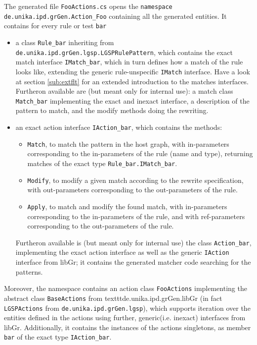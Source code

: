The generated file \texttt{FooActions.cs} opens the \texttt{namespace de.unika.ipd.grGen.Action\_Foo} containing all the generated entities.
It contains for every rule or test \texttt{bar}
\begin{itemize}
\item a class \texttt{Rule\_bar} inheriting from \texttt{de.unika.ipd.grGen.lgsp.LGSPRulePattern}, which contains
the exact match interface \texttt{IMatch\_bar}, which in turn defines how a match of the rule looks like,
extending the generic rule-unspecific \texttt{IMatch} interface.
Have a look at section \ref{sub:extflt} for an extended introduction to the matches interfaces. 
Furtheron available are (but meant only for internal use): a match class \texttt{Match\_bar} implementing the exact and inexact interface,
a description of the pattern to match, and the modify methods doing the rewriting.

\item an exact action interface \texttt{IAction\_bar}, which contains the methods:
  \begin{itemize}
  \item \texttt{Match}, to match the pattern in the host graph,
     with in-parameters corresponding to the in-parameters of the rule (name and type),
	 returning matches of the exact type \texttt{Rule\_bar.IMatch\_bar}.
  \item \texttt{Modify}, to modify a given match according to the rewrite specification,
     with out-parameters corresponding to the out-parameters of the rule.
  \item \texttt{Apply}, to match and modify the found match,
     with in-parameters corresponding to the in-parameters of the rule,
     and with ref-parameters corresponding to the out-parameters of the rule.
  \end{itemize}
  Furtheron available is (but meant only for internal use) the class \texttt{Action\_bar}, implementing the exact action interface as well as the generic \texttt{IAction} interface from libGr;
  it contains the generated matcher code searching for the patterns.
\end{itemize}

Moreover, the namespace contains an action class \texttt{FooActions}
implementing the abstract class \texttt{BaseActions} from texttt{de.unika.ipd.grGen.libGr} (in fact \texttt{LGSPActions} from \texttt{de.unika.ipd.grGen.lgsp}),
which supports iteration over the entities defined in the actions using further, generic(i.e. inexact) interfaces from libGr.
Additionally, it contains the instances of the actions singletons,
as member \texttt{bar} of the exact type \texttt{IAction\_bar}.

